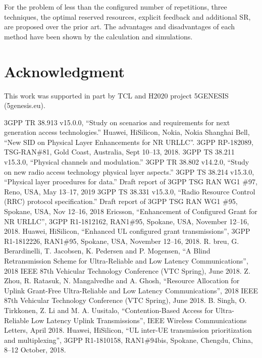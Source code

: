 \documentclass{ieeeaccess}
\begin{document}
For the problem of less than the configured number of repetitions, three techniques, the optimal reserved resources, explicit feedback and additional SR, are proposed over the prior art. The advantages and disadvantages of each method have been shown by the calculation and simulations.  

\section*{Acknowledgment}

This work was supported in part by TCL and H2020 project 5GENESIS (5genesis.eu).

\begin{thebibliography}{00}

 3GPP TR 38.913 v15.0.0, ``Study on scenarios and requirements for next generation access technologies.''
 Huawei, HiSilicon, Nokia, Nokia Shanghai Bell, ``New SID on Physical Layer Enhancements for NR URLLC''. 3GPP RP-182089, TSG-RAN\#81, Gold Coast, Australia, Sept 10--13, 2018.
 3GPP TS 38.211 v15.3.0, ``Physical channels and modulation.''
 3GPP TR 38.802 v14.2.0, ``Study on new radio access technology physical layer aspects.''
 3GPP TS 38.214 v15.3.0, ``Physical layer procedures for data.''
 Draft report of 3GPP TSG RAN WG1 \#97, Reno, USA, May 13--17, 2019
 3GPP TS 38.331 v15.3.0, ``Radio Resource Control (RRC) protocol specification.''
 Draft report of 3GPP TSG RAN WG1 \#95, Spokane, USA, Nov 12--16, 2018
 Ericsson, ``Enhancement of Configured Grant for NR URLLC'', 3GPP R1-1812162, RAN1\#95, Spokane, USA, November 12--16, 2018.
 Huawei, HiSilicon, ``Enhanced UL configured grant transmissions'', 3GPP R1-1812226, RAN1\#95, Spokane, USA, November 12--16, 2018.
 R. breu, G. Berardinelli, T. Jacobsen, K. Pedersen and P. Mogensen, ``A Blind Retransmission Scheme for Ultra-Reliable and Low Latency Communications'', 2018 IEEE 87th Vehicular Technology Conference (VTC Spring), June 2018.
 Z. Zhou, R. Ratasuk, N. Mangalvedhe and A. Ghosh, ``Resource Allocation for Uplink Grant-Free Ultra-Reliable and Low Latency Communications'', 2018 IEEE 87th Vehicular Technology Conference (VTC Spring), June 2018.
 B. Singh, O. Tirkkonen, Z. Li and M. A. Uusitalo, ``Contention-Based Access for Ultra-Reliable Low Latency Uplink Transmissions'',  IEEE Wireless Communications Letters, April 2018.
 Huawei, HiSilicon, ``UL inter-UE transmission prioritization and multiplexing'', 3GPP R1-1810158, RAN1\#94bis, Spokane, Chengdu, China, 8--12 October, 2018.

\end{thebibliography}
\end{document}
